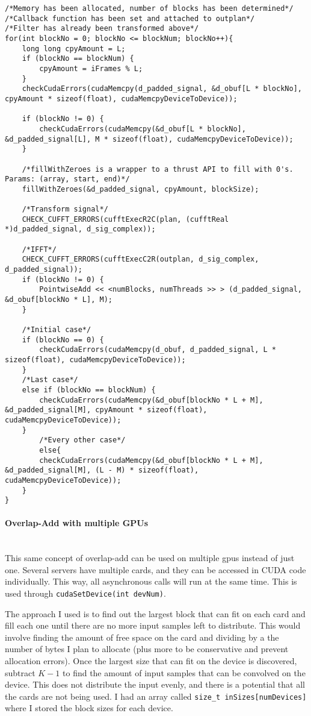 \begin{verbatim}
/*Memory has been allocated, number of blocks has been determined*/
/*Callback function has been set and attached to outplan*/
/*Filter has already been transformed above*/
for(int blockNo = 0; blockNo <= blockNum; blockNo++){
	long long cpyAmount = L;
	if (blockNo == blockNum) {
		cpyAmount = iFrames % L;
	}
	checkCudaErrors(cudaMemcpy(d_padded_signal, &d_obuf[L * blockNo], cpyAmount * sizeof(float), cudaMemcpyDeviceToDevice));
	
	if (blockNo != 0) {
		checkCudaErrors(cudaMemcpy(&d_obuf[L * blockNo], &d_padded_signal[L], M * sizeof(float), cudaMemcpyDeviceToDevice));
	}
	
	/*fillWithZeroes is a wrapper to a thrust API to fill with 0's. Params: (array, start, end)*/
	fillWithZeroes(&d_padded_signal, cpyAmount, blockSize);
	
	/*Transform signal*/
	CHECK_CUFFT_ERRORS(cufftExecR2C(plan, (cufftReal *)d_padded_signal, d_sig_complex));

	/*IFFT*/
	CHECK_CUFFT_ERRORS(cufftExecC2R(outplan, d_sig_complex, d_padded_signal));
	if (blockNo != 0) {
		PointwiseAdd << <numBlocks, numThreads >> > (d_padded_signal, &d_obuf[blockNo * L], M);
	}
	
	/*Initial case*/
	if (blockNo == 0) {
	    checkCudaErrors(cudaMemcpy(d_obuf, d_padded_signal, L * sizeof(float), cudaMemcpyDeviceToDevice));
	}
	/*Last case*/
	else if (blockNo == blockNum) {
		checkCudaErrors(cudaMemcpy(&d_obuf[blockNo * L + M], &d_padded_signal[M], cpyAmount * sizeof(float), cudaMemcpyDeviceToDevice));
	}
        /*Every other case*/
        else{
		checkCudaErrors(cudaMemcpy(&d_obuf[blockNo * L + M], &d_padded_signal[M], (L - M) * sizeof(float), cudaMemcpyDeviceToDevice));
	}
}
\end{verbatim}
\paragraph{Overlap-Add with multiple GPUs} \hspace{0pt} \\
\indent This same concept of overlap-add can be used on multiple \glspl{gpu} instead of just one. Several servers have multiple cards, and they can be accessed in CUDA code individually. This way, all asynchronous calls will run at the same time. This is used through \verb|cudaSetDevice(int devNum)|. 

The approach I used is to find out the largest block that can fit on each card and fill each one until there are no more input samples left to distribute. This would involve finding the amount of free space on the card and dividing by a the number of bytes I plan to allocate (plus more to be conservative and prevent allocation errors). Once the largest size that can fit on the device is discovered, subtract $K-1$ to find the amount of input samples that can be convolved on the device. This does not distribute the input evenly, and there is a potential that all the cards are not being used. I had an array called \verb|size_t inSizes[numDevices]| where I stored the block sizes for each device.

